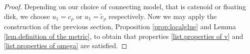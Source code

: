 \documentclass[reqno]{amsart}
\theoremstyle{definition}
\theoremstyle{remark}
\numberwithin{equation}{section}
\newcommand{\norm}[1]{\left\lVert#1\right\rVert}
\newcommand{\R}{\mathbb{R}}
\newcommand{\N}{\mathbb{N}}
\DeclareMathOperator{\dist}{dist}
\newcommand\res{\mathop{\hbox{\vrule height 7pt width .3pt depth 0pt\vrule height .3pt width 5pt depth 0pt}}\nolimits}
\newcommand{\bC}{\mathbf{C}} %
\newcommand{\bG}{\mathbf{G}} %
\def\a#1{\left\llbracket{#1}\right\rrbracket}
\begin{document}
\begin{proof}
Depending on our choice of connecting model, that is catenoid or floating disk, we choose $u_1=c_\rho$ or $u_1=\tilde{c}_\rho$ respectively. Now we may apply the construction of the previous section, Proposition \ref{prop:localglue} and Lemma \ref{lem.definition of the metric}, to obtain that properties \ref{list.properties of v} and \ref{list.properties of omega} are satisfied. 





\end{proof}
\end{document}
